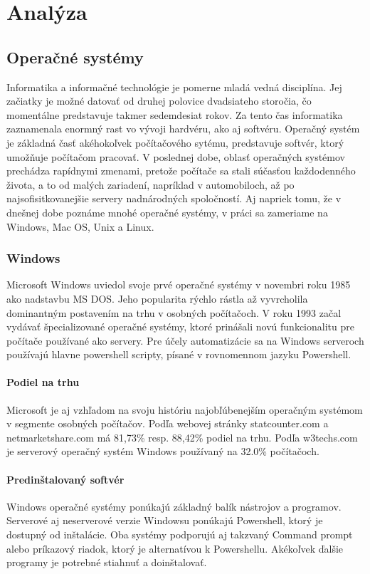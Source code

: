 \section{Analýza}
\subsection{Operačné systémy}
\indent Informatika a informačné technológie je pomerne mladá vedná disciplína. Jej začiatky je možné datovať od druhej polovice dvadsiateho storočia, čo momentálne predstavuje takmer sedemdesiat rokov. Za tento čas informatika zaznamenala enormný rast vo vývoji hardvéru, ako aj softvéru.  Operačný systém je základná časť akéhokoľvek počítačového sytému, predstavuje softvér, ktorý umožňuje počítačom pracovať. V poslednej dobe, oblasť operačných systémov  prechádza rapídnymi zmenami, pretože počítače sa stali súčasťou každodenného života, a to od malých zariadení, napríklad v automobiloch, až po najsofisitkovanejšie servery nadnárodných spoločností. Aj napriek tomu, že v dnešnej dobe poznáme mnohé operačné systémy, v práci sa zameriame na Windows, Mac OS, Unix a Linux.\cite{osbook}

\subsubsection{Windows}
\indent Microsoft Windows uviedol svoje prvé operačné systémy v novembri roku 1985 ako nadstavbu MS DOS. Jeho popularita rýchlo rástla až vyvrcholila dominantným postavením na trhu v osobných počítačoch. V roku 1993 začal vydávať špecializované operačné systémy, ktoré prinášali novú funkcionalitu pre počítače používané ako servery.\cite{windowsHistory} Pre účely automatizácie sa na Windows serveroch používajú hlavne powershell scripty, písané v rovnomennom jazyku Powershell\cite{winAutomation}.
\paragraph{Podiel na trhu}
\indent Microsoft je aj vzhľadom na svoju históriu najobľúbenejším operačným systémom v segmente osobných počítačov. Podľa webovej stránky statcounter.com\cite{statcounter} a netmarketshare.com\cite{netmarketshare} má 81,73\%  \acrshort{resp.}  88,42\% podiel na trhu.
\newline
\indent Podľa w3techs.com\cite{pop} je serverový operačný systém Windows používaný na 32.0\% počítačoch.
\paragraph{Predinštalovaný softvér}
\indent Windows operačné systémy ponúkajú základný balík nástrojov a programov. Serverové aj neserverové verzie Windowsu ponúkajú  Powershell, ktorý je dostupný od inštalácie.  Oba systémy podporujú aj takzvaný Command prompt alebo príkazový riadok, ktorý je alternatívou k Powershellu. Akékoľvek ďalšie programy je potrebné stiahnuť a doinštalovať.

